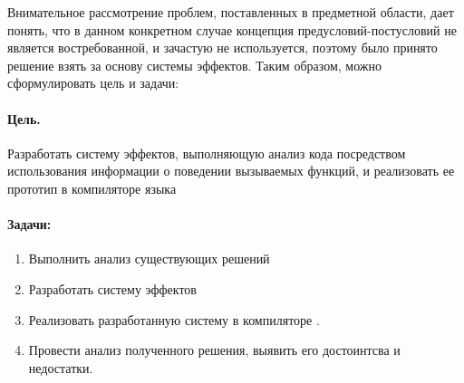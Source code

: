 Внимательное рассмотрение проблем, поставленных в предметной области, дает понять, что в данном конкретном случае концепция предусловий-постусловий не является востребованной, и зачастую не используется, поэтому было принято решение взять за основу системы эффектов. Таким образом, можно сформулировать цель и задачи:


\paragraph{Цель.} Разработать систему эффектов, выполняющую анализ кода посредством использования информации о поведении вызываемых функций, и реализовать ее прототип в компиляторе языка 

\paragraph{Задачи:}

\begin{enumerate}
  \item Выполнить анализ существующих решений

  \item Разработать систему эффектов

  \item Реализовать разработанную систему в компиляторе .

  \item Провести анализ полученного решения, выявить его достоинтсва и недостатки.
\end{enumerate}
